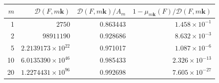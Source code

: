 \begin{tabular}{r r r r}
\hline
$m$ & $\mathcal D(F,m\mathbf k)$ & $\mathcal D(F,m\mathbf k)/A_m$ & $1-\mu_{m\mathbf k}(F)/\mathcal D(F,m\mathbf k)$\\
\hline
1 & $2750$ & 0.863443 & $1.458\times10^{-1}$ \\
2 & $98911190$ & 0.928686 & $8.632\times10^{-3}$ \\
5 & $2.2139173\times10^{22}$ & 0.971017 & $1.087\times10^{-6}$ \\
10 & $6.0135390\times10^{46}$ & 0.985433 & $2.326\times10^{-13}$ \\
20 & $1.2274431\times10^{96}$ & 0.992698 & $7.605\times10^{-27}$ \\
\hline
\end{tabular}
